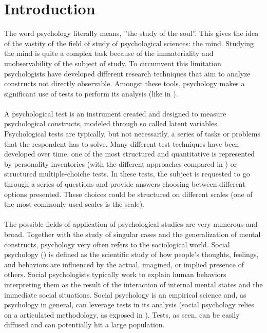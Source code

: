 \label{sec:introduction}
\section{Introduction}

The word psychology literally means, ”the study of the soul”. This gives the idea of the vastity of the field of study of psychological sciences: the mind.
Studying the mind is quite a complex task because of the immateriality and unobservability of the subject of study.
To circumvent this limitation psychologists have developed different research techniques that aim to analyze constructs not directly observable.
Amongst these tools, psychology makes a significant use of tests to perform its analysis (like in \cite{Cohen-1992}).\\
\\
A psychological test is an instrument created and designed to measure psychological constructs, modeled through so called latent variables.
Psychological tests are typically, but not necessarily, a series of tasks or problems that the respondent has to solve.
Many different test techniques have been developed over time, one of the most structured and quantitative is represented by personality inventories
(with the different approaches compared in \cite{Burisch-1984}) or structured multiple-choiche tests.
In these tests, the subject is requested to go through a series of questions and provide answers choosing between different options presented.
These choices could be structured on different scales (one of the most commonly used scales is the \cite{Likert-1932} scale).\\
\\
The possible fields of application of psychological studies are very numerous and broad.
Together with the study of singular cases and the generalization of mental constructs, psychology very often refers to the sociological world.
Social psychology (\cite{Smith-2006}) is defined as the scientific study of how people's thoughts, feelings, and behaviors are inﬂuenced by the actual, imagined,
or implied presence of others.
Social psychologists typically work to explain human behaviors interpreting them as the result of the interaction of internal mental states and the immediate
social situations.
Social psychology is an empirical science and, as psychology in general, can leverage tests in its analysis (social psychology relies on a articulated methodology,
as exposed in \cite{Reis-2000}).
Tests, as seen, can be easily diffused and can potentially hit a large population.

